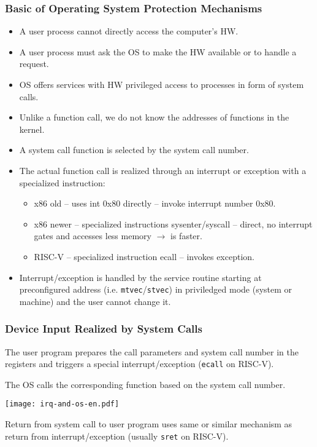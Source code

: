 \documentclass{beamer}
\begin{document}
\begin{frame}
\frametitle{Basic of Operating System Protection Mechanisms}

\begin{itemize}
\item A user process cannot directly access the computer's HW.
\item A user process must ask the OS to make the HW available or to handle a request.
\item OS offers services with HW privileged access to processes in form of system calls.
\item Unlike a function call, we do not know the addresses of functions in the kernel.
\item A system call function is selected by the system call number.
\item The actual function call is realized through an interrupt or exception with a specialized instruction:
\begin{itemize}
\item x86 old -- uses int 0x80 directly -- invoke interrupt number 0x80.
\item x86 newer -- specialized instructions sysenter/syscall -- direct, no interrupt gates and accesses less memory $\rightarrow$ is faster.
\item RISC-V -- specialized instruction ecall -- invokes exception.
\end{itemize}
\item Interrupt/exception is handled by the service routine starting at preconfigured address (i.e. \texttt{mtvec}/\texttt{stvec}) in priviledged mode (system or machine) and the user cannot change it.

\end{itemize}
\end{frame}

\begin{frame}
\frametitle{Device Input Realized by System Calls}

The user program prepares the call parameters and system call number in the registers and triggers a special interrupt/exception (\texttt{ecall} on RISC-V).

The OS calls the corresponding function based on the system call number.

\begin{center}
  \texttt{[image: irq-and-os-en.pdf]}
\end{center}

Return from system call to user program uses same or similar mechanism as return
from interrupt/exception (usually \texttt{sret} on RISC-V).
\end{frame}
\end{document}
